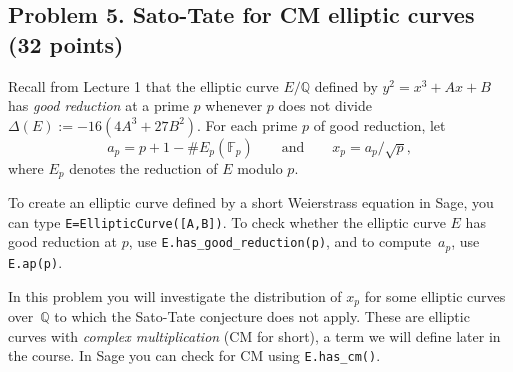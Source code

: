 \documentclass[11pt]{article}
\newcommand{\Fp}{\mathbb{F}_p}
\newcommand{\Q}{\mathbb{Q}}
\begin{document}
\subsection*{Problem 5. Sato-Tate for CM elliptic curves (32 points)}
Recall from Lecture 1 that the elliptic curve $E/\Q$ defined by $y^2=x^3+Ax+B$ has \emph{good reduction} at a prime $p$ whenever $p$ does not divide $\Delta(E) := -16(4A^3+27B^2)$.
For each prime $p$ of good reduction, let
\[
a_p=p+1-\#E_p(\Fp)\qquad\text{and}\qquad x_p=a_p/\sqrt{p},
\]
where $E_p$ denotes the reduction of $E$ modulo $p$.

To create an elliptic curve  defined by a short Weierstrass equation in Sage, you can type \texttt{E=EllipticCurve([A,B])}.  To check whether the elliptic curve $E$ has good reduction at $p$, use \texttt{E.has\_good\_reduction(p)}, and to compute~$a_p$, use \texttt{E.ap(p)}.

In this problem you will investigate the distribution of $x_p$ for some elliptic curves over~$\Q$ to which the Sato-Tate conjecture does not apply.
These are elliptic curves with \emph{complex multiplication} (CM for short), a term we will define later in the course.
In Sage you can check for CM using \texttt{E.has\_cm()}.
\end{document}
